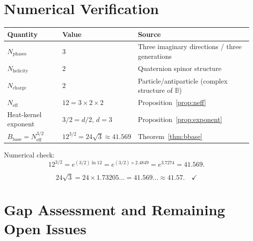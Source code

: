 \documentclass[11pt,a4paper]{article}
\begin{document}
\section{Numerical Verification}
\label{sec:numerical}

\begin{center}
\begin{tabular}{lll}
\hline
Quantity & Value & Source \\
\hline
$N_{\mathrm{phases}}$ & $3$ & Three imaginary directions / three generations \\
$N_{\mathrm{helicity}}$ & $2$ & Quaternion spinor structure \\
$N_{\mathrm{charge}}$ & $2$ & Particle/antiparticle (complex structure of $\mathbb{B}$) \\
$N_{\mathrm{eff}}$ & $12 = 3\times2\times2$ & Proposition~\ref{prop:neff} \\
Heat-kernel exponent & $3/2 = d/2$, $d=3$ & Proposition~\ref{prop:exponent} \\
$B_{\mathrm{base}} = N_{\mathrm{eff}}^{3/2}$ & $12^{3/2} = 24\sqrt{3}\approx 41.569$ & Theorem~\ref{thm:bbase} \\
\hline
\end{tabular}
\end{center}

Numerical check:
\begin{equation}
  12^{3/2} = e^{(3/2)\ln 12} = e^{(3/2)\times 2.4849} = e^{3.7274} = 41.569.
\end{equation}

\begin{equation}
  24\sqrt{3} = 24\times 1.73205\ldots = 41.569\ldots \approx 41.57. \quad\checkmark
\end{equation}

\section{Gap Assessment and Remaining Open Issues}
\label{sec:gaps}
\end{document}
